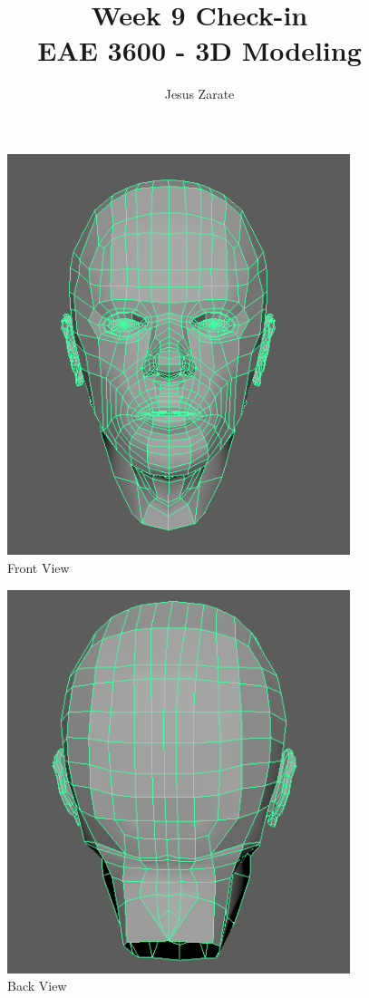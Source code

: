 \documentclass[a4paper]{article}
\title{
  Week 9 Check-in\\
  \large EAE 3600 - 3D Modeling}
\author{Jesus Zarate}
\begin{document}
\maketitle


\begin{figure}[h]
\centering
\includegraphics[width=10cm]{img/Front.png}
\caption{Front View}
\label{fig:Front View}
\end{figure}

\begin{figure}[h]
\centering
\includegraphics[width=10cm]{img/Back.png}
\caption{Back View}
\label{fig:Angle View}
\end{figure}
\end{document}
